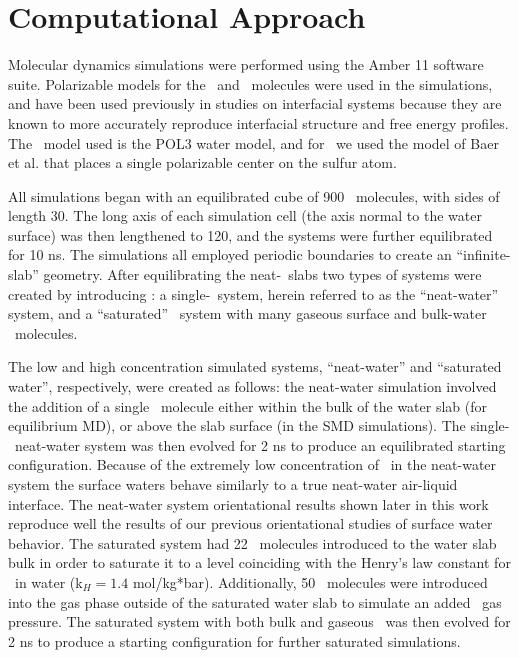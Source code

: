 \section{Computational Approach}

Molecular dynamics simulations were performed using the Amber 11 software suite.\cite{Case2010} Polarizable models for the \wat~and \suldiox~molecules were used in the simulations, and have been used previously in studies on interfacial systems because they are known to more accurately reproduce interfacial structure and free energy profiles.\cite{Wick2007,Rivera2006,Dang1998} The \wat~model used is the POL3 water model,\cite{Caldwell1995} and for \suldiox~we used the model of Baer et al. that places a single polarizable center on the sulfur atom.\cite{Baer2010}

All simulations began with an equilibrated cube of 900 \wat~molecules, with sides of length 30\angs. The long axis of each simulation cell (the axis normal to the water surface) was then lengthened to 120\angs, and the systems were further equilibrated for 10 ns. The simulations all employed periodic boundaries to create an ``infinite-slab'' geometry. After equilibrating the neat-\wat~slabs two types of systems were created by introducing \suldiox: a single-\suldiox~system, herein referred to as the ``neat-water'' system, and a ``saturated'' \suldiox~system with many gaseous surface and bulk-water \suldiox~molecules.

The low and high concentration simulated systems, ``neat-water'' and ``saturated water'', respectively, were created as follows: the neat-water simulation involved the addition of a single \suldiox~molecule either within the bulk of the water slab (for equilibrium MD), or above the slab surface (in the SMD simulations). The single-\suldiox~neat-water system was then evolved for 2 ns to produce an equilibrated starting configuration. Because of the extremely low concentration of \suldiox~in the neat-water system the surface waters behave similarly to a true neat-water air-liquid interface. The neat-water system orientational results shown later in this work reproduce well the results of our previous orientational studies of surface water behavior.\cite{Walker2006b,Hore2008} The saturated system had 22 \suldiox~molecules introduced to the water slab bulk in order to saturate it to a level coinciding with the Henry's law constant for \suldiox~in water (k\textdegree$_H = 1.4$ mol/kg*bar).\cite{Lide2000} Additionally, 50 \suldiox~molecules were introduced into the gas phase outside of the saturated water slab to simulate an added \suldiox~gas pressure. The saturated system with both bulk and gaseous \suldiox~was then evolved for 2 ns to produce a starting configuration for further saturated simulations.

